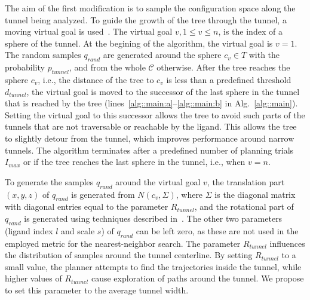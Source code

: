 \documentclass[usletter, 10pt, conference]{ieeeconf} %
\def\qrand{q_{rand}}
\def\C{\mathcal{C}}
\def\dt{d_{tunnel}}
\def\rv{R_{tunnel}}
\def\Imax{I_{max}} %
\def\gb{p_{tunnel}}
\begin{document}
The aim of the first modification is to sample the configuration space along the tunnel being analyzed.
To guide the growth of the tree through the tunnel, a moving virtual goal is used~\cite{vonasek2009rrt}.
The virtual goal $v, 1\le v \le n$, is the index of a sphere of the tunnel.
At the begining of the algorithm, the virtual goal is $v=1$.
The random samples $\qrand$ are generated around the sphere $c_v \in T$ with the probability $\gb$, and from the whole $\C$ otherwise.
After the tree reaches the sphere $c_v$, i.e., the distance of the tree to $c_v$ is
less than a predefined threshold $\dt$, the virtual goal is moved to the successor of the last sphere in the tunnel
that is reached by the tree (lines~\ref{alg::main:a}--\ref{alg::main:b} in Alg.~\ref{alg::main}).
Setting the virtual goal to this successor allows the tree to avoid such parts of the tunnels that are not traversable or reachable by the ligand.
This allows the tree to slightly detour from the tunnel, which improves performance around narrow tunnels.
The algorithm terminates after a predefined number of planning trials $\Imax$ or if the tree reaches
the last sphere in the tunnel, i.e., when $v = n$.

To generate the samples $\qrand$ around the virtual goal $v$, the translation part $(x,y,z)$ of $\qrand$ is generated
from $N(c_v,\Sigma)$, where $\Sigma$ is the diagonal matrix with diagonal entries equal to the parameter $\rv$, and the rotational
part of $\qrand$ is generated using techniques described in~\cite{kuffnerES}.
The other two parameters (ligand index $l$ and scale $s$) of $\qrand$ can be left zero, as these are not used in the employed
metric for the nearest-neighbor search.
The parameter $\rv$ influences the distribution of samples around the tunnel centerline. 
By setting $\rv$ to a small value, the planner attempts to find the trajectories inside the tunnel, while higher values
of $\rv$ cause  exploration of paths around the tunnel.
We propose to set this parameter to the average tunnel width.
\end{document}
